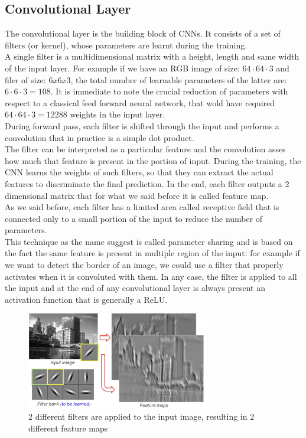 \documentclass[LaM,binding=0.6cm]{sapthesis}
\begin{document}
\subsection{Convolutional Layer}
The convolutional layer is the building block of CNNs. It consists of a set of filters (or kernel), whose parameters are learnt during the training.\\A single filter is a multidimensional matrix with a height, length and same width of the input layer. For example if we have an RGB image of size: $64\cdot64\cdot3$ and filer of size: $6x6x3$, the total number of learnable parameters of the latter are: $6\cdot6\cdot3=108$. It is immediate to note the crucial reduction of parameters with respect to a classical feed forward neural network, that wold have required $64\cdot64\cdot 3=12288$ weights in the input layer.\\During forward pass, each filter is shifted through the input and performs a convolution that in practice is a simple dot product.\\The filter can be interpreted as a particular feature and the convolution asses how much that feature is present in the portion of input. During the training, the CNN learns the weights of such filters, so that they can extract the actual features to discriminate the final prediction. In the end, each filter outputs a 2 dimensional matrix that for what we said before it is called feature map.\\As we said before, each filter has a limited area called receptive field that is connected only to a small portion of the input to reduce the number of parameters.\\This technique as the name suggest is called parameter sharing and is based on the fact the same feature is present in multiple region of the input: for example if we want to detect the border of an image, we could use a filter that properly activates when it is convoluted with them. In any case, the filter is applied to all the input and at the end of any convolutional  layer is always present an activation function that is generally a ReLU.
\begin{figure}[H]  \centering
	\includegraphics[width=80mm,scale=0.7]{exfilter}
	\caption{2 different filters are applied to the input image, resulting in 2 different feature maps \cite{cnnstackoverflow}}
	\label{fig:exfilter}
\end{figure}
\end{document}
